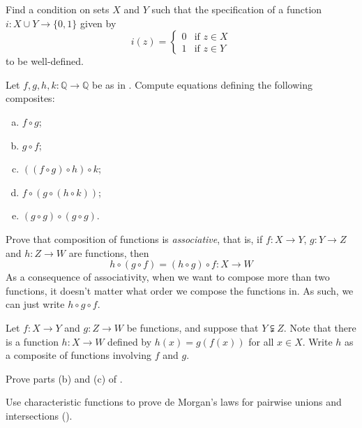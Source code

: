 \begin{exercise}
\label{exWellDefinednessOfFunctionOnUnion}
Find a condition on sets $X$ and $Y$ such that the specification of a function $i : X \cup Y \to \{ 0, 1 \}$ given by
\[ i(z) = \begin{cases} 0 & \text{if } z \in X \\ 1 & \text{if } z \in Y \end{cases} \]
to be well-defined.
\end{exercise}


\begin{exercise}
Let $f,g,h,k : \mathbb{Q} \to \mathbb{Q}$ be as in . Compute equations defining the following composites:
\begin{enumerate}[(a)]
\item $f \circ g$;
\item $g \circ f$;
\item $((f \circ g) \circ h) \circ k$;
\item $f \circ (g \circ (h \circ k))$;
\item $(g \circ g) \circ (g \circ g)$.
\end{enumerate}
\end{exercise}


\begin{exercise}
\label{exCompositionIsAssociative}
Prove that composition of functions is \textit{associative}, that is, if $f : X \to Y$, $g : Y \to Z$ and $h : Z \to W$ are functions, then
\[ h \circ (g \circ f) = (h \circ g) \circ f : X \to W \]
As a consequence of associativity, when we want to compose more than two functions, it doesn't matter what order we compose the functions in. As such, we can just write $h \circ g \circ f$.
\end{exercise}

\begin{exercise}
\label{exCompositionWithoutMatchingCodomains}
Let $f : X \to Y$ and $g : Z \to W$ be functions, and suppose that $Y \subsetneqq Z$. Note that there is a function $h : X \to W$ defined by $h(x)=g(f(x))$ for all $x \in X$. Write $h$ as a composite of functions involving $f$ and $g$.
\end{exercise}


\begin{exercise}
Prove parts (b) and (c) of .
\end{exercise}


\begin{exercise}
Use characteristic functions to prove de Morgan's laws for pairwise unions and intersections ().
\end{exercise}


